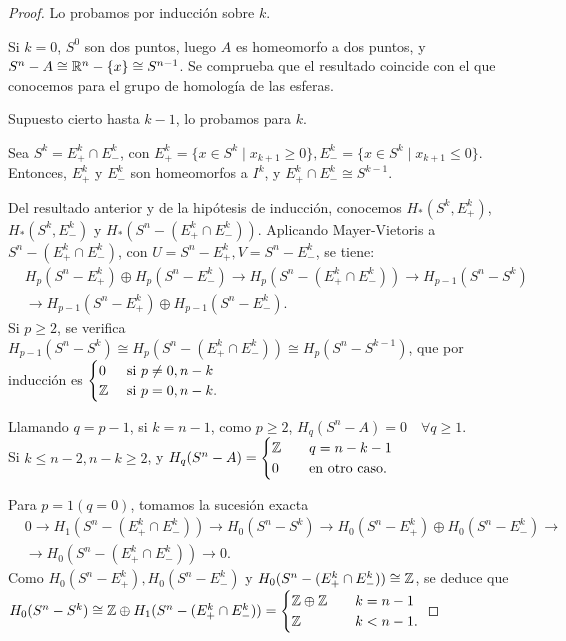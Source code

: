 \begin{proof}
  Lo probamos por inducción sobre $k$.

  Si $k = 0$, $S^0$ son dos puntos, luego $A$ es homeomorfo a dos puntos, y $S^n - A \cong \mathbb{R}^n - \{x\} \cong S^{n-1}$.
  Se comprueba que el resultado coincide con el que conocemos para el grupo de homología de las esferas.

  Supuesto cierto hasta $k - 1$, lo probamos para $k$.

  Sea $S^k = E_+^k \cap E_-^k$, con $E_+^k = \{x \in S^k \mid x_{k+1} \geq 0\}, E_-^k = \{x \in S^k \mid x_{k+1} \leq 0\}$.
  Entonces, $E_+^k$ y $E_-^k$ son homeomorfos a $I^k$, y $E_+^k \cap E_-^k \cong S^{k-1}$.

  Del resultado anterior y de la hipótesis de inducción, conocemos $H_*(S^k, E_+^k)$, $H_*(S^k, E_-^k)$ y $H_*(S^n - (E_+^k \cap E_-^k))$.
  Aplicando Mayer-Vietoris a $S^n - (E_+^k \cap E_-^k)$, con $U = S^n - E_+^k, V = S^n - E_-^k$, se tiene:
  \begin{align*}
    &H_p(S^n - E_+^k) \oplus H_p(S^n - E_-^k) \to H_p(S^n - (E_+^k \cap E_-^k)) \to H_{p-1}(S^n - S^k) \\
    &\to H_{p-1}(S^n - E_+^k) \oplus H_{p-1}(S^n - E_-^k).
  \end{align*}
  Si $p \geq 2$, se verifica $H_{p-1}(S^n - S^k) \cong H_p(S^n - (E_+^k \cap E_-^k)) \cong H_p(S^n - S^{k-1})$,
  que por inducción es $\begin{cases} 0 &\text{ si } p \neq 0, n-k \\ \mathbb{Z} &\text{ si } p = 0, n-k. \end{cases}$

  Llamando $q = p-1$, si $k = n-1$, como $p \geq 2$, $H_q(S^n - A) = 0 \quad \forall q \geq 1$.\\
  Si $k \leq n-2, n-k \geq 2$, y $H_q(S^n - A) = \begin{cases} \mathbb{Z} &\quad q = n-k-1 \\ 0 &\quad \text{en otro caso.} \end{cases}$

  Para $p = 1 (q = 0)$, tomamos la sucesión exacta
  \begin{align*}
    &0 \to H_1(S^n - (E_+^k \cap E_-^k)) \to H_0(S^n - S^k) \to H_0(S^n - E_+^k) \oplus H_0(S^n - E_-^k) \to \\
    &\to H_0(S^n - (E_+^k \cap E_-^k)) \to 0.
  \end{align*}
  Como $H_0(S^n - E_+^k), H_0(S^n - E_-^k)$ y $H_0(S^n - (E_+^k \cap E_-^k)) \cong \mathbb{Z}$,
  se deduce que $H_0(S^n - S^k) \cong \mathbb{Z} \oplus H_1(S^n - (E_+^k \cap E_-^k)) = \begin{cases} \mathbb{Z} \oplus \mathbb{Z} &\quad k = n-1 \\
                                                                                                    \mathbb{Z} &\quad k < n - 1.  \end{cases} $
\end{proof}

